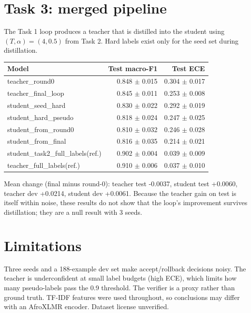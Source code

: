 \documentclass[10pt]{article}
\begin{document}
\section{Task 3: merged pipeline}
The Task 1 loop produces a teacher that is distilled into the student using $(T,\alpha)=(4,0.5)$ from Task 2. Hard labels exist only for the seed set during distillation.
\begin{center}\begin{tabular}{lrr}
\toprule
Model & Test macro-F1 & Test ECE \\
\midrule
teacher\_round0 & 0.848 $\pm$ 0.015 & 0.304 $\pm$ 0.017 \\
teacher\_final\_loop & 0.845 $\pm$ 0.011 & 0.253 $\pm$ 0.008 \\
student\_seed\_hard & 0.830 $\pm$ 0.022 & 0.292 $\pm$ 0.019 \\
student\_hard\_pseudo & 0.818 $\pm$ 0.024 & 0.247 $\pm$ 0.025 \\
student\_from\_round0 & 0.810 $\pm$ 0.032 & 0.246 $\pm$ 0.028 \\
student\_from\_final & 0.816 $\pm$ 0.035 & 0.214 $\pm$ 0.021 \\
student\_task2\_full\_labels(ref.) & 0.902 $\pm$ 0.004 & 0.039 $\pm$ 0.009 \\
teacher\_full\_labels(ref.) & 0.910 $\pm$ 0.006 & 0.037 $\pm$ 0.010 \\
\bottomrule
\end{tabular}\end{center}
Mean change (final minus round-0): teacher test -0.0037, student test +0.0060, teacher dev +0.0214, student dev +0.0061. Because the teacher gain on test is itself within noise, these results do not show that the loop's improvement survives distillation; they are a null result with 3 seeds.
\section{Limitations}
Three seeds and a 188-example dev set make accept/rollback decisions noisy. The teacher is underconfident at small label budgets (high ECE), which limits how many pseudo-labels pass the 0.9 threshold. The verifier is a proxy rather than ground truth. TF-IDF features were used throughout, so conclusions may differ with an AfroXLMR encoder. Dataset license unverified.
\end{document}
